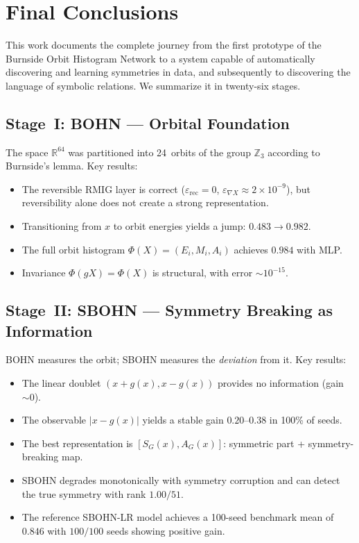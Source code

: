 \documentclass[11pt,a4paper]{report}
\begin{document}

\section{Final Conclusions}

This work documents the complete journey from the first prototype of the Burnside Orbit Histogram Network to a system capable of automatically discovering and learning symmetries in data, and subsequently to discovering the language of symbolic relations. We summarize it in twenty-six stages.

\subsection{Stage~I: BOHN --- Orbital Foundation}

The space $\mathbb{R}^{64}$ was partitioned into 24~orbits of the group $\mathbb{Z}_3$ according to Burnside's lemma. Key results:
\begin{itemize}
\item The reversible RMIG layer is correct ($\varepsilon_{\text{rec}}=0$, $\varepsilon_{\nabla X}\approx 2\times10^{-9}$), but reversibility alone does not create a strong representation.
\item Transitioning from $x$ to orbit energies yields a jump: $0.483\to0.982$.
\item The full orbit histogram $\Phi(X)=(E_i,M_i,A_i)$ achieves $0.984$ with MLP.
\item Invariance $\Phi(gX)=\Phi(X)$ is structural, with error ${\sim}10^{-15}$.
\end{itemize}

\subsection{Stage~II: SBOHN --- Symmetry Breaking as Information}

BOHN measures the orbit; SBOHN measures the \emph{deviation} from it. Key results:
\begin{itemize}
\item The linear doublet $(x+g(x),x-g(x))$ provides no information (gain ${\sim}0$).
\item The observable $|x-g(x)|$ yields a stable gain $0.20$--$0.38$ in 100\% of seeds.
\item The best representation is $[S_G(x),A_G(x)]$: symmetric part + symmetry-breaking map.
\item SBOHN degrades monotonically with symmetry corruption and can detect the true symmetry with rank $1.00/51$.
\item The reference SBOHN-LR model achieves a 100-seed benchmark mean of $0.846$ with $100/100$ seeds showing positive gain.
\end{itemize}
\end{document}
